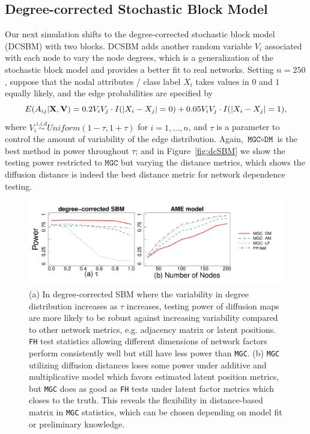 \documentclass[11pt]{article}
\theoremstyle{definition}
\begin{document}
\subsection{Degree-corrected Stochastic Block Model}
Our next simulation shifts to the degree-corrected stochastic block model (DCSBM) with two blocks. DCSBM adds another random variable $V_{i}$ associated with each node to vary the node degrees, which is a generalization of the stochastic block model and provides a better fit to real networks. Setting $n=250$, suppose that the nodal attributes / class label $X_i$ takes values in $0$ and $1$ equally likely, and the edge probabilities are specified by  
\vspace*{-0.4cm}
\begin{equation}
E( A_{ij} | \mathbf{X}, \mathbf{V} )  = 0.2 V_{i} V_{j} \cdot I ( |X_{i} - X_{j}| = 0 ) + 0.05 V_{i} V_{j} \cdot I(|X_{i} - X_{j}| = 1),
\label{eq:tau}
\vspace*{-0.4cm}
\end{equation} 
where $V_{i} \overset{i.i.d}{\sim} Uniform(1 - \tau, 1 + \tau)$ for $i = 1, \ldots, n$, and $\tau$ is a parameter to control the amount of variability of the edge distribution. Again, $\texttt{MGC} \circ \texttt{DM}$ is the best method in power throughout $\tau$; and in Figure~\ref{fig:dcSBM} we show the testing power restricted to $\texttt{MGC}$ but varying the distance metrics, which shows the diffusion distance is indeed the best distance metric for network dependence testing.

\begin{figure}[H]
	\centering
	\includegraphics[width=\textwidth]{amedc.pdf}
	\caption{(a) In degree-corrected SBM where the variability in degree distribution increases as $\tau$ increases, testing power of diffusion maps are more likely to be robust against increasing variability compared to other network metrics, e.g. adjacency matrix or latent positions. \texttt{FH} test statistics allowing different dimensions of network factors perform consistently well but still have less power than \texttt{MGC}. (b) \texttt{MGC} utilizing diffusion distances loses some power under additive and multiplicative model which favors estimated latent position metrics, but \texttt{MGC} does as good as \texttt{FH} tests under latent factor metrics which closes to the truth. This reveals the flexibility in distance-based matrix in \texttt{MGC} statistics, which can be chosen depending on model fit or preliminary knowledge.}
	\label{fig:combined}
\end{figure}	
\end{document}
